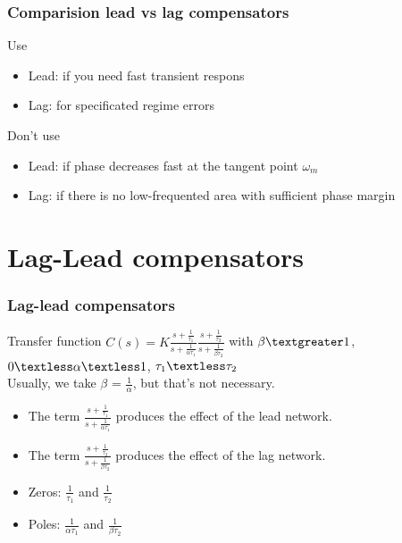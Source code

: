 \begin{frame}
\frametitle{Comparision lead vs lag compensators}
\begin{block}{Use}
\begin{itemize}
\item Lead: if you need fast transient respons
\item Lag: for specificated regime errors
\end{itemize}
\end{block}
\begin{block}{Don't use}
\begin{itemize}
\item Lead: if phase decreases fast at the tangent point $\omega_m$
\item Lag: if there is no low-frequented area with sufficient phase margin
\end{itemize}
\end{block}
\end{frame}

\section{Lag-Lead compensators}

\begin{frame}
\frametitle{Lag-lead compensators}
\begin{block}{Transfer function}
	$C(s) = K\frac{s + \frac{1}{\tau_1}}{s + \frac{1}{\alpha\tau_1}}\frac{s + \frac{1}{\tau_2}}{s + \frac{1}{\beta\tau_2}}$ with $\beta \textgreater 1$, $0 \textless \alpha \textless 1$, $\tau_1 \textless \tau_2$ \\
	Usually, we take $\beta$ = $\frac{1}{\alpha}$, but that's not necessary. \\
	\begin{itemize}
	\item The term $\frac{s + \frac{1}{\tau_1}}{s + \frac{1}{\alpha\tau_1}}$ produces the effect of the lead network.
	\item The term $\frac{s + \frac{1}{\tau_2}}{s + \frac{1}{\beta\tau_2}}$ produces the effect of the lag network.
	\item Zeros: $\frac{1}{\tau_1}$ and $\frac{1}{\tau_2}$
	\item Poles: $\frac{1}{\alpha \tau_1}$ and $\frac{1}{\beta \tau_2}$
	\end{itemize}
\end{block}

\end{frame}


